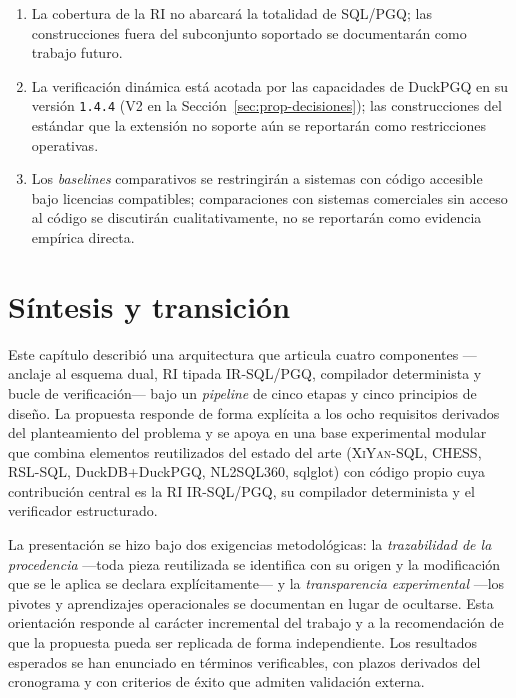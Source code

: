 \begin{enumerate}
    \item La cobertura de la \ac{RI} no abarcará la totalidad de \ac{SQL}/\ac{PGQ}; las construcciones fuera del subconjunto soportado se documentarán como trabajo futuro.
    \item La verificación dinámica está acotada por las capacidades de DuckPGQ en su versión \texttt{1.4.4} (V2 en la Sección~\ref{sec:prop-decisiones}); las construcciones del estándar que la extensión no soporte aún se reportarán como restricciones operativas.
    \item Los \emph{baselines} comparativos se restringirán a sistemas con código accesible bajo licencias compatibles; comparaciones con sistemas comerciales sin acceso al código se discutirán cualitativamente, no se reportarán como evidencia empírica directa.
\end{enumerate}

\section{Síntesis y transición}
\label{sec:prop-sintesis}

Este capítulo describió una arquitectura que articula cuatro componentes ---anclaje al esquema dual, \ac{RI} tipada IR-SQL/PGQ, compilador determinista y bucle de verificación--- bajo un \emph{pipeline} de cinco etapas y cinco principios de diseño. La propuesta responde de forma explícita a los ocho requisitos derivados del planteamiento del problema y se apoya en una base experimental modular que combina elementos reutilizados del estado del arte (\textsc{XiYan-SQL}, \textsc{CHESS}, \textsc{RSL-SQL}, DuckDB+DuckPGQ, \textsc{NL2SQL360}, sqlglot) con código propio cuya contribución central es la \ac{RI} IR-SQL/PGQ, su compilador determinista y el verificador estructurado.

La presentación se hizo bajo dos exigencias metodológicas: la \emph{trazabilidad de la procedencia} ---toda pieza reutilizada se identifica con su origen y la modificación que se le aplica se declara explícitamente--- y la \emph{transparencia experimental} ---los pivotes y aprendizajes operacionales se documentan en lugar de ocultarse. Esta orientación responde al carácter incremental del trabajo y a la recomendación de que la propuesta pueda ser replicada de forma independiente. Los resultados esperados se han enunciado en términos verificables, con plazos derivados del cronograma y con criterios de éxito que admiten validación externa.

